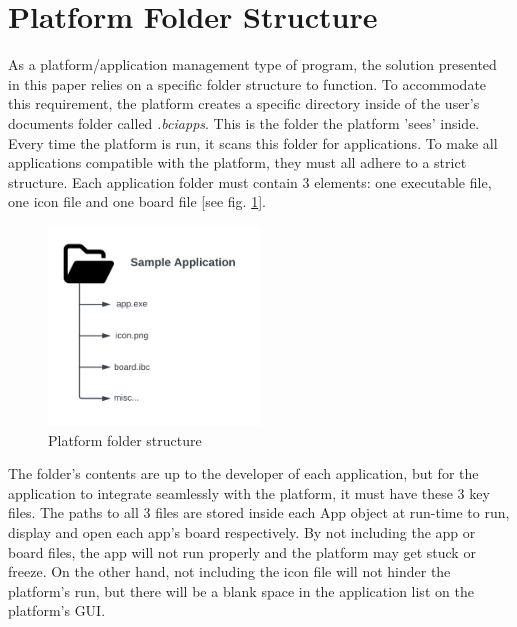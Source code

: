 \section{Platform Folder Structure} \label{sect:Platform Folder Structure}
As a platform/application management type of program, the solution presented in this paper relies on a specific folder structure to function. To accommodate this requirement, the platform creates a specific directory inside of the user's documents folder called \textit{.bciapps}. This is the folder the platform 'sees' inside. Every time the platform is run, it scans this folder for applications. To make all applications compatible with the platform, they must all adhere to a strict structure. Each application folder must contain 3 elements: one executable file, one icon file and one board file [see fig. \ref{fig:folder structure}].

\begin{figure}[H]
  \centering
  \includegraphics[width=0.5\textwidth]{Diagrams/Folder Structure.png}
  \caption{Platform folder structure}
  \label{fig:folder structure}
\end{figure}

The folder's contents are up to the developer of each application, but for the application to integrate seamlessly with the platform, it must have these 3 key files. The paths to all 3 files are stored inside each App object at run-time to run, display and open each app's board respectively. By not including the app or board files, the app will not run properly and the platform may get stuck or freeze. On the other hand, not including the icon file will not hinder the platform's run, but there will be a blank space in the application list on the platform's GUI.

